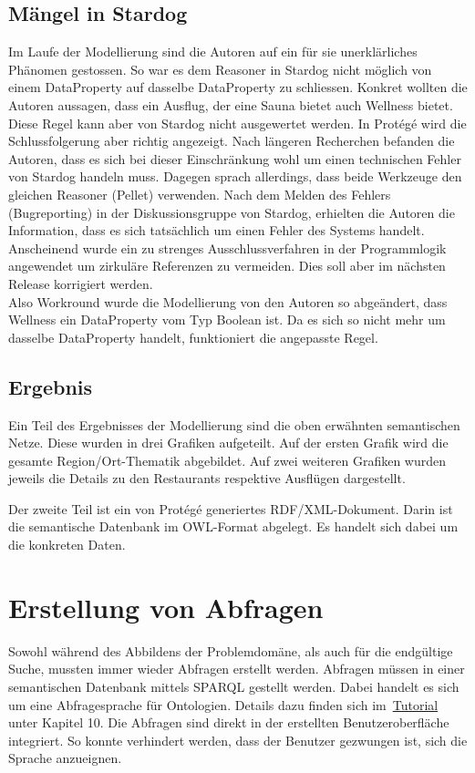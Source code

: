 \subsection{Mängel in Stardog}
\label{subsec:loesung_modellierung_maengel_stardog}
Im Laufe der Modellierung sind die Autoren auf ein für sie unerklärliches Phänomen gestossen. So war es dem Reasoner in Stardog nicht möglich von einem DataProperty auf dasselbe DataProperty zu schliessen. Konkret wollten die Autoren aussagen, dass ein Ausflug, der eine Sauna bietet auch Wellness bietet. Diese Regel kann aber von Stardog nicht ausgewertet werden. In Protégé wird die Schlussfolgerung aber richtig angezeigt. Nach längeren Recherchen befanden die Autoren, dass es sich bei dieser Einschränkung wohl um einen technischen Fehler von Stardog handeln muss. Dagegen sprach allerdings, dass beide Werkzeuge den gleichen Reasoner (Pellet) verwenden. Nach dem Melden des Fehlers (Bugreporting) in der Diskussionsgruppe von Stardog, erhielten die Autoren die Information, dass es sich tatsächlich um einen Fehler des Systems handelt. Anscheinend wurde ein zu strenges Ausschlussverfahren in der Programmlogik angewendet um zirkuläre Referenzen zu vermeiden. Dies soll aber im nächsten Release korrigiert werden. \\
Also Workround wurde die Modellierung von den Autoren so abgeändert, dass Wellness ein DataProperty vom Typ Boolean ist. Da es sich so nicht mehr um dasselbe DataProperty handelt, funktioniert die angepasste Regel.

\subsection{Ergebnis}
\label{subsec:loesung_modellierung_ergebnis}
Ein Teil des Ergebnisses der Modellierung sind die oben erwähnten semantischen Netze. Diese wurden in drei Grafiken aufgeteilt. Auf der ersten Grafik wird die gesamte Region/Ort-Thematik abgebildet. Auf zwei weiteren Grafiken wurden jeweils die Details zu den Restaurants respektive Ausflügen dargestellt.

Der zweite Teil ist ein von Protégé generiertes RDF/XML-Dokument. Darin ist die semantische Datenbank im OWL-Format abgelegt. Es handelt sich dabei um die konkreten Daten.

\section{Erstellung von Abfragen}
\label{sec:loesung_sparql}
Sowohl während des Abbildens der Problemdomäne, als auch für die endgültige Suche, mussten immer wieder Abfragen erstellt werden. Abfragen müssen in einer semantischen Datenbank mittels SPARQL gestellt werden. Dabei handelt es sich um eine Abfragesprache für Ontologien. Details dazu finden sich im~\hyperref[sec:anhang:tutorial_dokument]{Tutorial} unter Kapitel 10. Die Abfragen sind direkt in der erstellten Benutzeroberfläche integriert. So konnte verhindert werden, dass der Benutzer gezwungen ist, sich die Sprache anzueignen.

